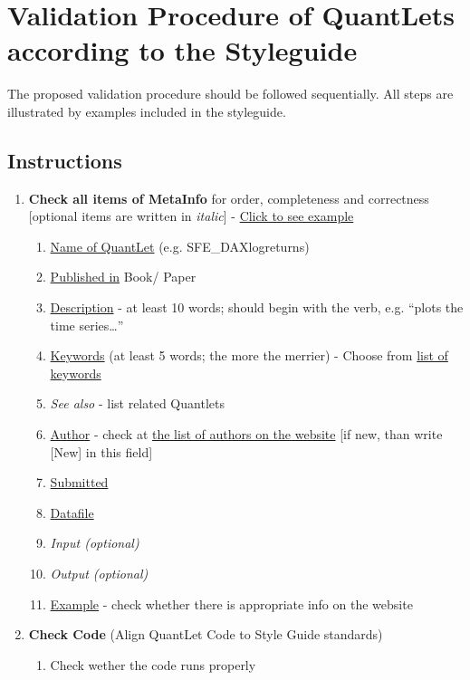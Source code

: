 \documentclass{article}
\begin{document}
\section*{Validation Procedure of QuantLets according to the Styleguide}
The proposed validation procedure should be followed sequentially. All steps are illustrated by examples included in the styleguide.

\subsection*{Instructions} %
\begin{enumerate}[label*=\arabic*.]
	\item \textbf{Check all items of MetaInfo} for order, completeness and correctness [optional items are written 	in \textit{italic}] - \label{MetaInfo-ini}\hyperref[MetaInfo]{Click to see example}
	\begin{enumerate}[label*=\arabic*.]
		\item \underline{Name of QuantLet} (e.g. SFE\_DAXlogreturns)
		\item \underline{Published in} Book/ Paper
		\item \underline{Description} - at least 10 words; should begin with the verb, e.g. “plots the time 			series…”
		\item \underline{Keywords} (at least 5 words; the more the merrier) - 
		Choose from \href{http://quantnet.wiwi.hu-berlin.de/index.php?p=searchResults&w=allkeywords&sort			=f}{list of keywords}
		\item \textit{See also} - list related Quantlets
		\item \underline{Author} - check at  \href{http://quantnet.hu-berlin.de/}{the list of  authors on the 		website} [if new, than write [New] in this field]
		\item \underline{Submitted}
		\item \underline{Datafile}
		\item \textit{Input (optional)}
		\item \textit{Output (optional)}
		\item \underline{Example} - check whether there is appropriate info on the website
	\end{enumerate}
	\item \textbf{Check Code} (Align QuantLet Code to Style Guide standards) 
	\begin {enumerate}[label*=\arabic*.]
		\item Check wether the code runs properly

\end{enumerate}
\end{enumerate}
\end{document}
